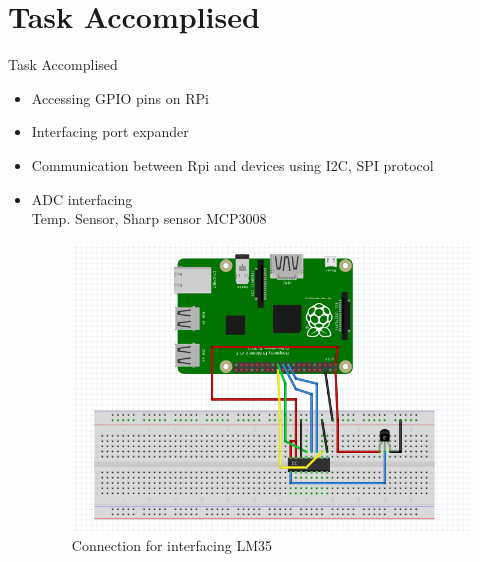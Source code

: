 \documentclass[10pt, a4paper]{beamer}
\begin{document}
\section{Task Accomplised}
\begin{frame}{Task Accomplised}
	\begin{itemize}
		\item Accessing GPIO pins on RPi
		\item Interfacing port expander
		\item Communication between Rpi and devices using I2C,
		      SPI protocol
		\item ADC interfacing \\Temp. Sensor, Sharp sensor MCP3008
		\begin{figure}[h!]
			\includegraphics[scale=0.3]{lm35_interfacing.jpg}
			\centering
			\caption{Connection for interfacing LM35}
		\end{figure} 
	
	\end{itemize}
\end{frame}
\end{document}
